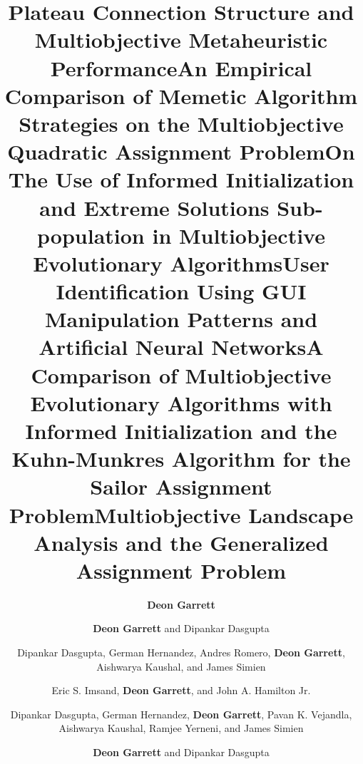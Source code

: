 \documentclass[a4paper,10pt]{cvclean}
\begin{document}
\begin{publications}
\begin{conferencepapers}
\begin{paper}
    \end{paper}
    \begin{paper}
      \title{Plateau Connection Structure and Multiobjective Metaheuristic
        Performance}
      \author{\textbf{Deon Garrett}}
    \end{paper}
    \begin{paper}
      \title{An Empirical Comparison of Memetic Algorithm Strategies on the
        Multiobjective Quadratic Assignment Problem}
      \author{\textbf{Deon Garrett} and Dipankar Dasgupta}
    \end{paper}
    \begin{paper}
      \title{On The Use of Informed Initialization and Extreme Solutions
        Sub-population in Multiobjective Evolutionary Algorithms}
      \author{Dipankar Dasgupta, German Hernandez, Andres Romero, \textbf{Deon Garrett},
        Aishwarya Kaushal, and James Simien}
    \end{paper}
    \begin{paper}
      \title{User Identification Using GUI Manipulation Patterns and Artificial
        Neural Networks}
      \author{Eric S. Imsand, \textbf{Deon Garrett}, and John A. Hamilton Jr.}
    \end{paper}
    \begin{paper}
      \title{A Comparison of Multiobjective Evolutionary Algorithms with
        Informed Initialization and the Kuhn-Munkres Algorithm for the Sailor
        Assignment Problem} 
      \author{Dipankar Dasgupta, German Hernandez, \textbf{Deon Garrett}, Pavan
        K. Vejandla, Aishwarya Kaushal, Ramjee Yerneni, and James Simien}
    \end{paper}
    \begin{paper}
      \title{Multiobjective Landscape Analysis and the Generalized Assignment
        Problem}
      \author{\textbf{Deon Garrett} and Dipankar Dasgupta}

\end{paper}
\end{conferencepapers}
\end{publications}
\end{document}
